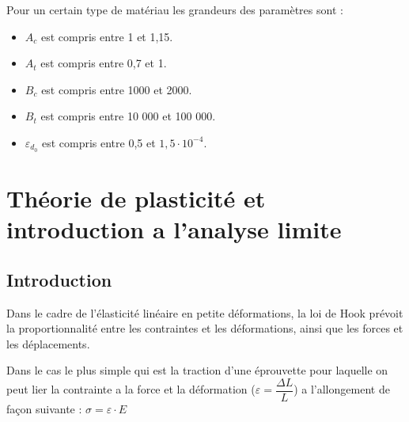 \documentclass[12pt,a4paper]{report}
\begin{document}
	Pour un certain type de matériau les grandeurs des paramètres sont :
	\begin{itemize}[label*=$\bullet$]
		
	\item $A_{c}$ est compris entre 1 et 1,15.
	
	\item $A_{t}$ est compris entre 0,7 et 1.
	
	\item $B_{c}$ est compris entre 1000 et 2000.
	
	\item $B_{t}$ est compris entre 10 000 et 100 000.
	
	\item $\varepsilon_{d_{0}}$ est compris entre 0,5 et $1,5 \cdot 10^{ - 4}$.
	
	\end{itemize}
	
	
	
	
	
	\newpage
	
	
	
	
	
	
	
	
	
	
	
	
	
	
	
	
	
	\chapter{Théorie de plasticité et introduction a l'analyse limite}
	
	
	\section{Introduction}
	
	
	
	Dans le cadre de l'élasticité linéaire en petite déformations, la loi de Hook prévoit la proportionnalité entre les contraintes et les déformations, ainsi que les forces et les déplacements.
	
	\vspace{\baselineskip}
	
	Dans le cas le plus simple qui est la traction d'une éprouvette pour laquelle on peut lier la contrainte a la force et la déformation ($\varepsilon = \dfrac{\Delta L}{L}$) a l'allongement de façon suivante : $\sigma = \varepsilon \cdot E$
	
\end{document}
